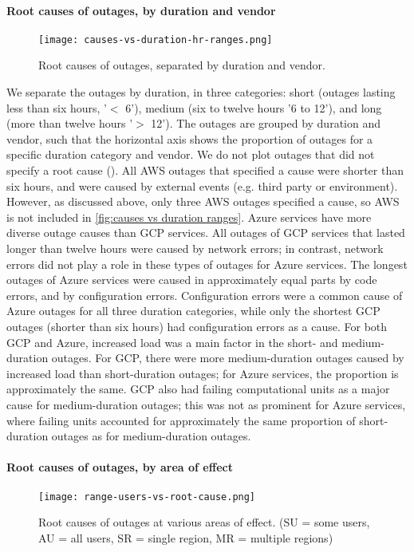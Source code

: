 \paragraph{Root causes of outages, by duration and vendor}
\begin{figure}
  \centering
  \texttt{[image: causes-vs-duration-hr-ranges.png]}
  \caption{Root causes of outages, separated by duration and vendor.}
  \label{fig:causes vs duration ranges}
\end{figure}

We separate the outages by duration, in three categories: short (outages lasting less than six hours, '$<$ 6'), medium (six to twelve hours '6 to 12'), and long (more than twelve hours '$>$ 12').
The outages are grouped by duration and vendor, such that the horizontal axis shows the proportion of outages for a specific duration category and vendor.
We do not plot outages that did not specify a root cause ().
All AWS outages that specified a cause were shorter than six hours, and were caused by external events (e.g. third party or environment).
However, as discussed above, only three AWS outages specified a cause, so AWS is not included in \autoref{fig:causes vs duration ranges}.
Azure services have more diverse outage causes than GCP services.
All outages of GCP services that lasted longer than twelve hours were caused by network errors; in contrast, network errors did not play a role in these types of outages for Azure services.
The longest outages of Azure services were caused in approximately equal parts by code errors, and by configuration errors.
Configuration errors were a common cause of Azure outages for all three duration categories, while only the shortest GCP outages (shorter than six hours) had configuration errors as a cause.
For both GCP and Azure, increased load was a main factor in the short- and medium-duration outages.
For GCP, there were more medium-duration outages caused by increased load than short-duration outages; for Azure services, the proportion is approximately the same.
GCP also had failing computational units as a major cause for medium-duration outages; this was not as prominent for Azure services, where failing units accounted for approximately the same proportion of short-duration outages as for medium-duration outages.

\paragraph{Root causes of outages, by area of effect}
\begin{figure}
  \centering
  \texttt{[image: range-users-vs-root-cause.png]}
  \caption{Root causes of outages at various areas of effect. (SU = some users, AU = all users, SR = single region, MR = multiple regions)}
  \label{fig:causes vs aoes}
\end{figure}

